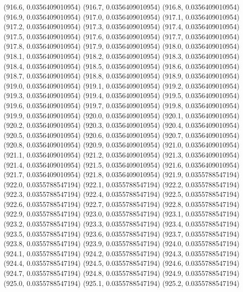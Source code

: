 {					(916.6, 0.0356409010954)
					(916.7, 0.0356409010954)
					(916.8, 0.0356409010954)
					(916.9, 0.0356409010954)
					(917.0, 0.0356409010954)
					(917.1, 0.0356409010954)
					(917.2, 0.0356409010954)
					(917.3, 0.0356409010954)
					(917.4, 0.0356409010954)
					(917.5, 0.0356409010954)
					(917.6, 0.0356409010954)
					(917.7, 0.0356409010954)
					(917.8, 0.0356409010954)
					(917.9, 0.0356409010954)
					(918.0, 0.0356409010954)
					(918.1, 0.0356409010954)
					(918.2, 0.0356409010954)
					(918.3, 0.0356409010954)
					(918.4, 0.0356409010954)
					(918.5, 0.0356409010954)
					(918.6, 0.0356409010954)
					(918.7, 0.0356409010954)
					(918.8, 0.0356409010954)
					(918.9, 0.0356409010954)
					(919.0, 0.0356409010954)
					(919.1, 0.0356409010954)
					(919.2, 0.0356409010954)
					(919.3, 0.0356409010954)
					(919.4, 0.0356409010954)
					(919.5, 0.0356409010954)
					(919.6, 0.0356409010954)
					(919.7, 0.0356409010954)
					(919.8, 0.0356409010954)
					(919.9, 0.0356409010954)
					(920.0, 0.0356409010954)
					(920.1, 0.0356409010954)
					(920.2, 0.0356409010954)
					(920.3, 0.0356409010954)
					(920.4, 0.0356409010954)
					(920.5, 0.0356409010954)
					(920.6, 0.0356409010954)
					(920.7, 0.0356409010954)
					(920.8, 0.0356409010954)
					(920.9, 0.0356409010954)
					(921.0, 0.0356409010954)
					(921.1, 0.0356409010954)
					(921.2, 0.0356409010954)
					(921.3, 0.0356409010954)
					(921.4, 0.0356409010954)
					(921.5, 0.0356409010954)
					(921.6, 0.0356409010954)
					(921.7, 0.0356409010954)
					(921.8, 0.0356409010954)
					(921.9, 0.0355788547194)
					(922.0, 0.0355788547194)
					(922.1, 0.0355788547194)
					(922.2, 0.0355788547194)
					(922.3, 0.0355788547194)
					(922.4, 0.0355788547194)
					(922.5, 0.0355788547194)
					(922.6, 0.0355788547194)
					(922.7, 0.0355788547194)
					(922.8, 0.0355788547194)
					(922.9, 0.0355788547194)
					(923.0, 0.0355788547194)
					(923.1, 0.0355788547194)
					(923.2, 0.0355788547194)
					(923.3, 0.0355788547194)
					(923.4, 0.0355788547194)
					(923.5, 0.0355788547194)
					(923.6, 0.0355788547194)
					(923.7, 0.0355788547194)
					(923.8, 0.0355788547194)
					(923.9, 0.0355788547194)
					(924.0, 0.0355788547194)
					(924.1, 0.0355788547194)
					(924.2, 0.0355788547194)
					(924.3, 0.0355788547194)
					(924.4, 0.0355788547194)
					(924.5, 0.0355788547194)
					(924.6, 0.0355788547194)
					(924.7, 0.0355788547194)
					(924.8, 0.0355788547194)
					(924.9, 0.0355788547194)
					(925.0, 0.0355788547194)
					(925.1, 0.0355788547194)
					(925.2, 0.0355788547194)
}
